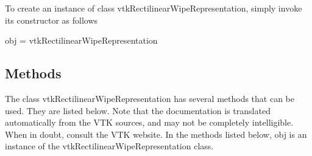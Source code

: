To create an instance of class vtk\-Rectilinear\-Wipe\-Representation, simply invoke its constructor as follows \begin{DoxyVerb}  obj = vtkRectilinearWipeRepresentation
\end{DoxyVerb}
 \hypertarget{vtkwidgets_vtkxyplotwidget_Methods}{}\subsection{Methods}\label{vtkwidgets_vtkxyplotwidget_Methods}
The class vtk\-Rectilinear\-Wipe\-Representation has several methods that can be used. They are listed below. Note that the documentation is translated automatically from the V\-T\-K sources, and may not be completely intelligible. When in doubt, consult the V\-T\-K website. In the methods listed below, {\ttfamily obj} is an instance of the vtk\-Rectilinear\-Wipe\-Representation class. 
